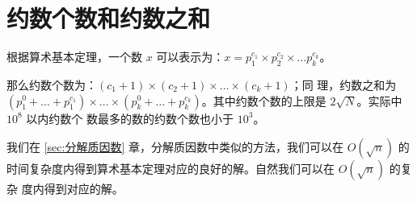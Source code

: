 
\section{约数个数和约数之和}
根据算术基本定理，一个数 $x$ 可以表示为：$x = p_1^{c_1} \times p_2^{c_2} \times
\ldots p_k^{c_k}$。

那么约数个数为：$(c_1 + 1) \times (c_2 + 1) \times \ldots \times (c_k + 1)$；同
理，约数之和为 $(p_1^0 + \ldots + p_1^{c_1}) \times \ldots \times (p_k^0 +
\ldots + p_k^{c_k})$。其中约数个数的上限是 $2\sqrt N$。实际中 $10^8$ 以内约数个
数最多的数的约数个数也小于 $10^3$。

我们在 \ref{sec:分解质因数} 章，分解质因数中类似的方法，我们可以在 $O(\sqrt n)$
的时间复杂度内得到算术基本定理对应的良好的解。自然我们可以在 $O(\sqrt n)$ 的复杂
度内得到对应的解。


